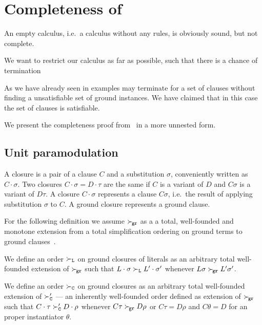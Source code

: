 
\chapter{Completeness of \InstGenEQ}

An empty calculus,
i.e.~a calculus without any rules,
is obviously sound, but not complete.


We want to restrict our calculus as far as possible,
such that there is a chance of termination

As we have already seen in examples \InstGenEQ{}
may terminate for a set of clauses without finding
a unsatisfiable set of ground instances.
We have claimed that in this case the set of clauses is satisfiable.



We present the completeness proof from~\cite{GK2004csl} in a more unnested form.


\section{Unit paramodulation}\label{sec:unit:paramodulation}

\begin{definition}
    A closure is a pair of a clause \( C \) and a substitution \( \sigma \),
    conveniently written as \( C\cdot\sigma \). Two closures \( C\cdot\sigma = D\cdot\tau \)
    are the same if \( C \) is a variant of \( D \) and \( C\sigma \) is a variant of \( D\tau \).
    A closure \( C\cdot\sigma \) represents a clause \( C\sigma \),
    i.e.~the result of applying substitution \( \sigma \) to \( C \).
    A ground closure represents a ground clause.
\end{definition}

For the following definition we assume
\( \mathrel\succ_{\!\mathtt{gr}} \) as a a total, well-founded and monotone extension
from a total simplification ordering on ground terms
to ground clauses~\cite{NR2001}.

\begin{definition}
    We define an order \( \mathrel\succ_{\mathtt{L}} \) on ground closures of literals
    as an arbitrary total well-founded extension of \( \mathrel\succ_{\!\mathtt{gr}} \)
    such that
   \( L\cdot\sigma\mathrel\succ_{\mathtt{L}} L'\cdot\sigma' \) whenever
   \( L\sigma\mathrel\succ_{\!\mathtt{gr}} L'\sigma' \).

    We define an order \( \mathrel\succ_{\mathtt{C}} \) on ground closures
    as an arbitrary total well-founded extension of
   \( \mathrel\succ_{\mathtt{C}}' \) --- an inherently well-founded order defined as extension of \( \mathrel\succ_{\!\mathtt{gr}} \)
    such that
   \( C\cdot\tau\mathrel\succ_{\mathtt{C}}' D\cdot\rho \) whenever
   \( C\tau\mathrel\succ_{\!\mathtt{gr}} D\rho \) or \( C\tau = D\rho \) and \( C\theta = D \) for an proper instantiator \( \theta \).
\end{definition}


